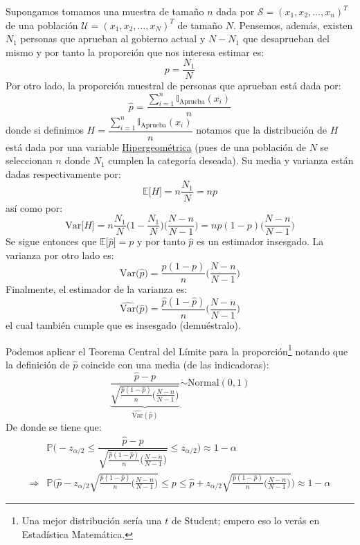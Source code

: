 \documentclass[
]{book}
\begin{document}
Supongamos tomamos una muestra de tamaño \(n\) dada por \(\mathcal{S} = (x_1, x_2, \dots, x_n)^T\) de una población \(\mathcal{U} = (x_1, x_2, \dots, x_N)^T\) de tamaño \(N\). Pensemos, además, existen \(N_1\) personas que aprueban al gobierno actual y \(N- N_1\) que desaprueban del mismo y por tanto la proporción que nos interesa estimar es:
\[
p = \dfrac{N_1}{N}
\]
Por otro lado, la proporción muestral de personas que aprueban está dada por:
\[
\hat{p} = \dfrac{\sum_{i = 1}^n \mathbb{I}_{\text{Aprueba}}(x_i)}{n}
\]
donde si definimos \(H = \dfrac{\sum_{i = 1}^n \mathbb{I}_{\text{Aprueba}}(x_i)}{n}\) notamos que la distribución de \(H\) está dada por una variable \href{https://en.wikipedia.org/wiki/Hypergeometric_distribution}{Hipergeométrica} (pues de una población de \(N\) se seleccionan \(n\) donde \(N_1\) cumplen la categoría deseada). Su media y varianza están dadas respectivamente por:
\[
\mathbb{E}\big[ H \big] = n \dfrac{N_1}{N} = np
\]
así como por:
\[
\textrm{Var}\big[ H\big] = n \dfrac{N_1}{N} \Big( 1 - \dfrac{N_1}{N}\Big) \Big( \dfrac{N-n}{N-1}\Big) = np (1-p)\Big( \dfrac{N-n}{N-1}\Big)
\]
Se sigue entonces que \(\mathbb{E}\big[\hat{p}\big] = p\) y por tanto \(\hat{p}\) es un estimador insesgado. La varianza por otro lado es:
\[
\textrm{Var}\big( \hat{p} \big) = \dfrac{p(1-p)}{n}\Big( \dfrac{N-n}{N-1}\Big)
\]
Finalmente, el estimador de la varianza es:
\[
\widehat{\textrm{Var}}\big( \hat{p} \big) = \dfrac{\hat{p}(1-\hat{p})}{n}\Big( \dfrac{N-n}{N-1}\Big)
\]
el cual también cumple que es insesgado (demuéstralo).

Podemos aplicar el Teorema Central del Límite para la proporción\footnote{Una mejor distribución sería una \(t\) de Student; empero eso lo verás en Estadística Matemática.} notando que la definición de \(\hat{p}\) coincide con una media (de las indicadoras):
\[
\underbrace{\dfrac{\hat{p} - p}{\sqrt{\frac{\hat{p}(1-\hat{p})}{n} \Big( \frac{N-n}{N-1} \Big)}}}_{\widehat{\text{Var}}(\hat{p})}\mathrel{\dot\sim} \textrm{Normal}(0,1)
\]
De donde se tiene que:
\begin{equation}
\begin{aligned}
& \mathbb{P}\Bigg(- z_{\alpha/2} \leq \dfrac{\hat{p} - p}{\sqrt{\frac{\hat{p}(1-\hat{p})}{n} \Big( \frac{N-n}{N-1} \Big)}}\leq z_{\alpha/2}\Bigg) \approx 1 - \alpha \\
\Rightarrow & \mathbb{P}\Bigg( \hat{p} - z_{\alpha/2} \sqrt{\frac{\hat{p}(1-\hat{p})}{n} \Big( \frac{N-n}{N-1} \Big)} \leq  p \leq \hat{p} +  z_{\alpha/2} \sqrt{\frac{\hat{p}(1-\hat{p})}{n} \Big( \frac{N-n}{N-1} \Big)}\Bigg) \approx 1 - \alpha 
\end{aligned}
\end{equation}
\end{document}
